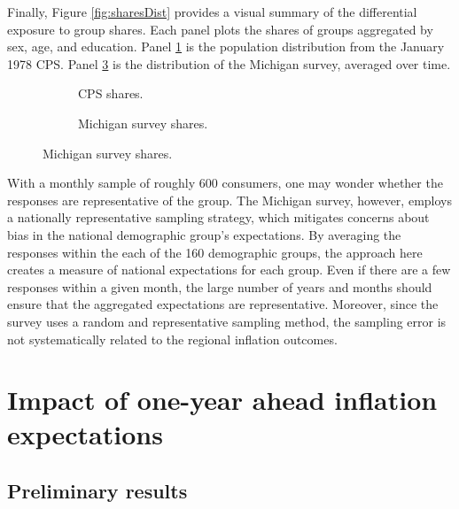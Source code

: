 \documentclass[12pt]{article}
\begin{document}
Finally, Figure \ref{fig:sharesDist} provides a visual summary of the differential exposure to group shares.   Each panel plots the shares of groups aggregated by sex, age, and education.  Panel \ref{subfig:sharesDist:cps} is the population distribution from the January 1978 CPS.  Panel \ref{subfig:sharesDist:michigan} is the distribution of the Michigan survey, averaged over time. 

\begin{figure}
  \centering
  \caption{Distribution of group shares, aggregated by sex, age, and education, across regions.}\label{fig:sharesDist}
  \begin{subfigure}[t]{\textwidth}
    \centering
    
    \caption{CPS shares.}\label{subfig:sharesDist:cps}
  \end{subfigure}
  \quad 
  \begin{subfigure}[t]{\textwidth}
    \centering
    
    \caption{Michigan survey shares.}\label{subfig:sharesDist:michigan}
  \end{subfigure}
\end{figure}

With a monthly sample of roughly 600 consumers, one may wonder whether the responses are representative of the group.  The Michigan survey, however, employs a nationally representative sampling strategy, which mitigates concerns about bias in the national demographic group's expectations. By averaging the responses within the each of the 160 demographic groups, the approach here creates a measure of national expectations for each group.  Even if there are a few responses within a given month, the large number of years and months should ensure that the aggregated expectations are representative.  Moreover, since the survey uses a random and representative sampling method, the sampling error is not systematically related to the regional inflation outcomes.

\section{Impact of one-year ahead inflation expectations}

\subsection{Preliminary results}
\end{document}
